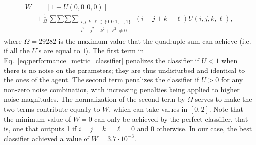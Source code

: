 \begin{equation}
\begin{split}
W &= \left[1 - U\left(0,0,0,0\right)\right] \\
& + \frac{1}{\Omega} \mathop{\sum \sum \sum \sum}_{\begin{smallmatrix} i, j, k, \ell \in \lbrace 0, 0.1, \dots, 1 \rbrace \\ i^2 + j^2+k^2 + \ell^2 \neq 0 \end{smallmatrix}} \left(i+j+k+\ell\right) U\left(i,j,k,\ell\right),
\end{split}
\label{eq:performance_metric_classifier}
\end{equation}
where $\Omega=29282$ is the maximum value that the quadruple sum can achieve (i.e. if all the $U$'s are equal to $1$). The first term in Eq.~\ref{eq:performance_metric_classifier} penalizes the classifier if $U<1$ when there is no noise on the parameters; they are thus undisturbed and identical to the ones of the agent. The second term penalizes the classifier if $U>0$ for any non-zero noise combination, with increasing penalties being applied to higher noise magnitudes. The normalization of the second term by $\Omega$ serves to make the two terms contribute equally to $W$, which can take values in $[0,2]$. Note that the minimum value of $W=0$ can only be achieved by the perfect classifier, that is, one that outputs 1 if $i=j=k=\ell=0$ and $0$ otherwise. In our case, the best classifier achieved a value of $W=3.7\cdot 10^{-3}$.


